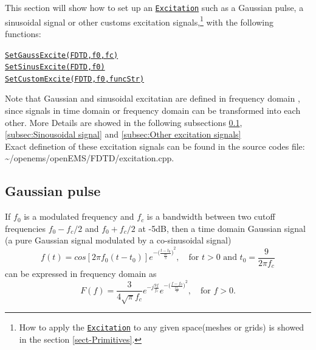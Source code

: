 This section will show how to set up an \hyperref[para:Excitation]{\texttt{Excitation}} such as a Gaussian pulse, a sinusoidal signal or other customs excitation signals,\footnote{How to apply the \hyperref[para:Excitation]{\texttt{Excitation}}  to any given space(meshes or grids) is showed in the section \ref{sect-Primitives}.} with the following functions:
       \begin{myindentpar}
	      \hyperref[func:SetGaussExcite]{\texttt{SetGaussExcite(FDTD,f0,fc)}} \\ 
	      \hyperref[func:SetSinusExcite]{\texttt{SetSinusExcite(FDTD,f0)}}\\ 
	      \hyperref[func:SetCustomExcite]{\texttt{SetCustomExcite(FDTD,f0,funcStr)}}
       \end{myindentpar}
Note that Gaussian and sinusoidal excitatian are defined in frequency domain , since signals in time domain or frequency domain can be transformed into each other.   More Details are showed in the following subsections \ref{subsec:Gaussian pulse}, \ref{subsec:Sinousoidal signal} and \ref{subsec:Other excitation signals}\\
Exact definetion of these excitation signals can be found in the source codes file: \textasciitilde/openems/openEMS/FDTD/excitation.cpp.\\
    \subsection{Gaussian pulse} \label{subsec:Gaussian pulse}
If $f_0$ is a modulated frequency and $f_c$ is a bandwidth between  two cutoff frequencies $f_0-f_c/2$ and  $f_0+f_c/2$ at -5dB, then a time domain Gaussian signal (a pure Gaussian signal modulated by a co-sinusoidal signal)
\begin{equation}\label{equ:GussianSignal_time}
 f(t)=cos[2\pi f_0(t-t_0)]e^{-{\big(\frac{t-t_0}{\frac{t0}{3}}\big)}^2}, \quad \text{for } t>0 \text{ and }t_0=\frac{9}{2\pi f_c}
\end{equation}
can be expressed  in frequency domain as
\begin{equation}\label{equ:GussianSignal_freq}
F(f)=\frac{3}{4\sqrt{\pi}f_c}e^{-j\frac{9f}{f_c}}e^{-{\big(\frac{f-f_0}{\frac{2f_c}{3}}\big)}^2},\quad \text{for } f>0 .
\end{equation}

